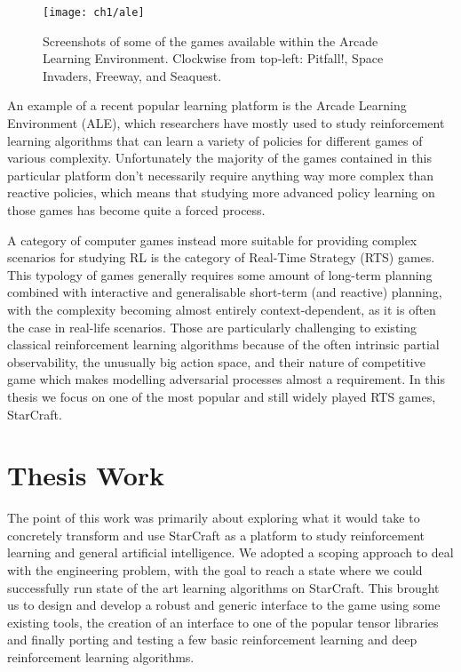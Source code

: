 \begin{figure}[h]
    \centering
    \texttt{[image: ch1/ale]}
    \caption{Screenshots of some of the games available within the Arcade
      Learning Environment. Clockwise from top-left: Pitfall!, Space Invaders,
      Freeway, and Seaquest.}
    \label{fig:ALE}
\end{figure}

An example of a recent popular learning platform is the Arcade Learning
Environment (ALE), which researchers have mostly used to study reinforcement
learning algorithms that can learn a variety of policies for different games of
various complexity. Unfortunately the majority of the games contained in this
particular platform don't necessarily require anything way more complex than
reactive policies, which means that studying more advanced policy learning on
those games has become quite a forced process.

A category of computer games instead more suitable for providing complex
scenarios for studying RL is the category of Real-Time Strategy (RTS) games.
This typology of games generally requires some amount of long-term planning
combined with interactive and generalisable short-term (and reactive) planning,
with the complexity becoming almost entirely context-dependent, as it is often
the case in real-life scenarios. Those are particularly challenging to existing
classical reinforcement learning algorithms because of the often intrinsic
partial observability, the unusually big action space, and their nature of
competitive game which makes modelling adversarial processes almost a
requirement. In this thesis we focus on one of the most popular and still widely
played RTS games, StarCraft.


\section{Thesis Work}

The point of this work was primarily about exploring what it would take to
concretely transform and use StarCraft as a platform to study reinforcement
learning and general artificial intelligence. We adopted a scoping approach to
deal with the engineering problem, with the goal to reach a state where we could
successfully run state of the art learning algorithms on StarCraft. This brought
us to design and develop a robust and generic interface to the game using some
existing tools, the creation of an interface to one of the popular tensor
libraries and finally porting and testing a few basic reinforcement learning and
deep reinforcement learning algorithms.


